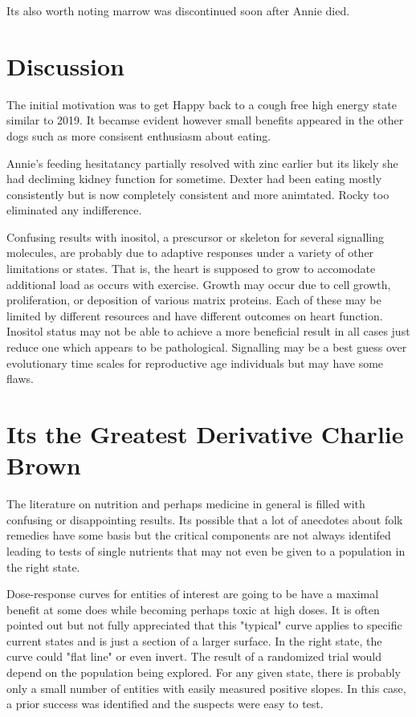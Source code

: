 Its also worth noting marrow was discontinued soon after Annie died.


\mjmtol{
}

\section{Discussion}
The initial motivation was to get Happy back to a cough free high
energy state similar to 2019. It becamse evident however small
benefits appeared in the other dogs such as more consisent enthusiasm
about eating. 

Annie's feeding hesitatancy partially resolved with zinc earlier but
its likely she had decliming kidney function for sometime. Dexter had
been eating mostly consistently but is now completely consistent and
more animtated. Rocky too eliminated any indifference. 

Confusing results with inositol, a prescursor or skeleton for
several signalling molecules, are probably due to adaptive
responses under a variety of other limitations or states.
That is, the heart is supposed to grow to accomodate additional
load as occurs with exercise. Growth may occur due to cell growth,
proliferation, or deposition of various matrix proteins. Each of
these may be limited by different resources and have different outcomes
on heart function. Inositol status may not be able to achieve a more
beneficial result in all cases just reduce one which appears to be
pathological. Signalling may be a best guess over evolutionary time
scales for reproductive age individuals but may have some flaws. 
 



\section{Its the Greatest Derivative Charlie Brown }

The literature on nutrition and perhaps medicine in general
is filled with confusing or disappointing results. 
Its possible that a lot of anecdotes about folk remedies have
some basis but the critical components are not always identifed
leading to tests of single nutrients that may not even be given
to a population in the right state. 

Dose-response curves for entities of interest are going to 
be have a maximal benefit at some does while becoming perhaps
toxic at high doses. It is often pointed out but not fully 
appreciated that this "typical" curve applies to specific
current states and is just a section of a larger surface.
In the right state, the curve could "flat line" or even invert.
The result of a randomized trial would depend on the population
being explored.  For any given state, there is probably only
a small number of entities with easily measured positive slopes.
In this case, a prior success was identified and the suspects
were easy to test. 

